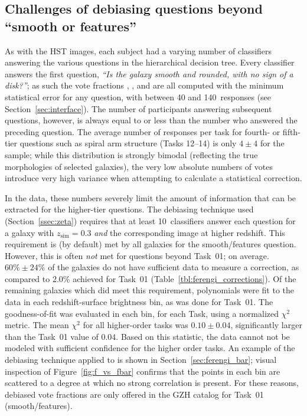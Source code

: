 \documentclass[twocolumn]{aastex6}
\begin{document}
\subsection{Challenges of debiasing questions beyond ``smooth or features''}\label{ssec:higher_order_tasks}

As with the HST images, each \ferengi{} subject had a varying number of classifiers
answering the various questions in the hierarchical decision tree. Every classifier
answers the first question, {\it ``Is the galaxy smooth and rounded, with no
sign of a disk?''}; as such the vote fractions \fsmooth, \ffeatures, and
\fartifact{} are all computed with the minimum statistical error for any
question, with between 40 and 140~responses (see Section~\ref{sec:interface}).
The number of participants answering subsequent questions, however, is always equal
to or less than the number who answered the preceding question. The average number
of responses per task for fourth- or fifth-tier questions such as spiral arm
structure (Tasks 12--14) is only $4\pm4$ for the \ferengi{} sample; while this
distribution is strongly bimodal (reflecting the true morphologies of
selected galaxies), the very low absolute numbers of votes introduce very high
variance when attempting to calculate a statistical correction.

In the \ferengi{} data, these numbers severely limit the amount of information
that can be extracted for the higher-tier questions. The debiasing technique
used (Section~\ref{ssec:zeta}) requires that at least 10~classifiers answer each
question for a galaxy with $z_\mathrm{sim}=0.3$ \emph{and} the corresponding
image at higher redshift. This requirement is (by default) met by all galaxies
for the smooth/features question. However, this is often \emph{not} met for
questions beyond Task~01; on average. $60\%\pm24\%$ of the galaxies do not have
sufficient data to measure a correction, as compared to 2.0\% achieved for
Task~01 (Table~\ref{tbl:ferengi_corrections}). Of the remaining
\ferengi{} galaxies which did meet this requirement, polynomials were fit to
the data in each redshift-surface brightness bin, as was done for Task~01. The
goodness-of-fit was evaluated in each bin, for each Task, using a normalized
$\chi^2$ metric. The mean $\chi^2$ for all higher-order tasks was
$0.10\pm0.04$, significantly larger than the Task~01 value of $0.04$. Based on
this statistic, the data cannot not be modeled with sufficient confidence for
the higher order tasks. An example of the debiasing technique applied to
\fbar{} is shown in Section~\ref{sec:ferengi_bar}; visual inspection of
Figure~\ref{fig:f_vs_fbar} confirms that the points in each bin are scattered
to a degree at which no strong correlation is present.  For these reasons,
debiased vote fractions are only offered in the GZH catalog for Task~01
(smooth/features).  
\end{document}

